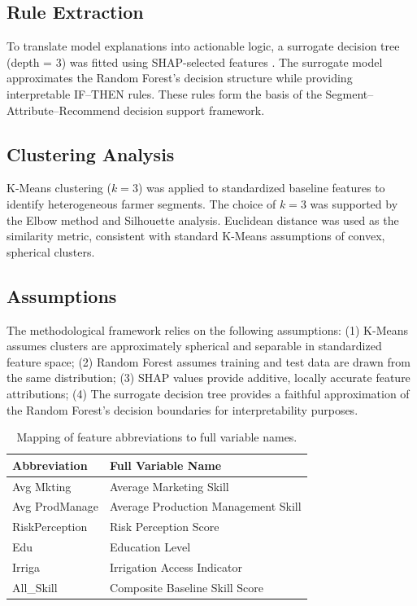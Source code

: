 \subsection{Rule Extraction}
To translate model explanations into actionable logic, a surrogate decision tree (depth = 3) was fitted using SHAP-selected features \citep{molnar2022interpretable}. The surrogate model approximates the Random Forest’s decision structure while providing interpretable IF–THEN rules. These rules form the basis of the Segment–Attribute–Recommend decision support framework.

\subsection{Clustering Analysis}
K-Means clustering ($k=3$) was applied to standardized baseline features to identify heterogeneous farmer segments. The choice of $k=3$ was supported by the Elbow method and Silhouette analysis. Euclidean distance was used as the similarity metric, consistent with standard K-Means assumptions of convex, spherical clusters.

\subsection{Assumptions}
The methodological framework relies on the following assumptions:  
(1) K-Means assumes clusters are approximately spherical and separable in standardized feature space;  
(2) Random Forest assumes training and test data are drawn from the same distribution;  
(3) SHAP values provide additive, locally accurate feature attributions;  
(4) The surrogate decision tree provides a faithful approximation of the Random Forest’s decision boundaries for interpretability purposes.

\begin{table}[H]
\centering
\caption{Mapping of feature abbreviations to full variable names.}
\begin{tabular}{ll}
\toprule
Abbreviation & Full Variable Name \\
\midrule
Avg Mkting & Average Marketing Skill \\
Avg ProdManage & Average Production Management Skill \\
RiskPerception & Risk Perception Score \\
Edu & Education Level \\
Irriga & Irrigation Access Indicator \\
All\_Skill & Composite Baseline Skill Score \\
\bottomrule
\end{tabular}
\end{table}
